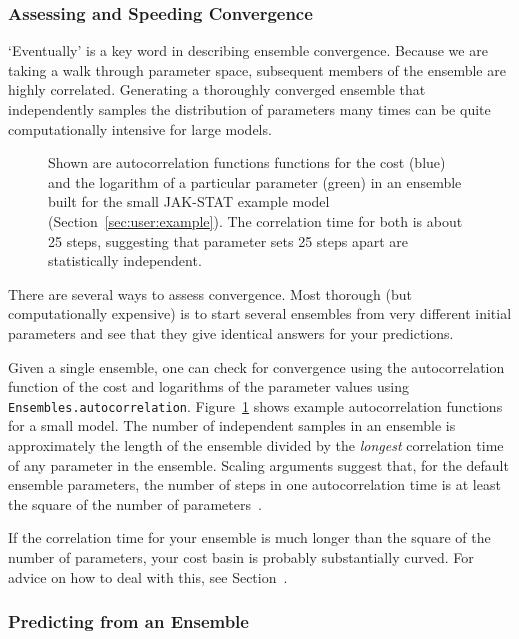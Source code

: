 \documentclass[12pt]{article}
\makeatletter
\newcommand{\py}[1]{\lstinline[language=Python, showstringspaces=False]@#1@}
\makeatother
\begin{document}
\subsubsection{Assessing and Speeding Convergence}

`Eventually' is a key word in describing ensemble convergence.
Because we are taking a walk through parameter space, subsequent members of the ensemble are highly correlated.
Generating a thoroughly converged ensemble that independently samples the distribution of parameters many times can be quite computationally intensive for large models.

\begin{figure}
\begin{center}
\end{center}
\caption[Example autocorrelation functions]{Shown are autocorrelation functions functions for the cost (blue) and the logarithm of a particular parameter (green) in an ensemble built for the small JAK-STAT example model (Section~\ref{sec:user:example}). The correlation time for both is about 25 steps, suggesting that parameter sets 25 steps apart are statistically independent.\label{fig:user:autocorr}}
\end{figure}

There are several ways to assess convergence.
Most thorough (but computationally expensive) is to start several ensembles from very different initial parameters and see that they give identical answers for your predictions.

Given a single ensemble, one can check for convergence using the autocorrelation function of the cost and logarithms of the parameter values using \py{Ensembles.autocorrelation}.
Figure~\ref{fig:user:autocorr} shows example autocorrelation functions for a small model.
The number of independent samples in an ensemble is approximately the length of the ensemble divided by the \emph{longest} correlation time of any parameter in the ensemble.
Scaling arguments suggest that, for the default ensemble parameters, the number of steps in one autocorrelation time is at least the square of the number of parameters~\cite[Section 3.5.1]{bib:GutenkunstPhD}.

If the correlation time for your ensemble is much longer than the square of the number of parameters, your cost basin is probably substantially curved.
For advice on how to deal with this, see Section~\cite[Section 6.3]{bib:GutenkunstPhD}.

\subsubsection{Predicting from an Ensemble}
\end{document}
